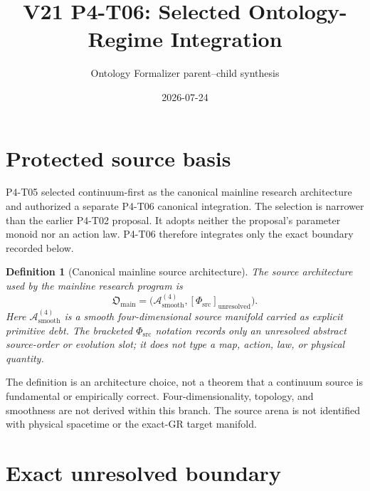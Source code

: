 \documentclass[11pt]{article}
\title{V21 P4-T06: Selected Ontology-Regime Integration}
\author{Ontology Formalizer parent--child synthesis}
\date{2026-07-24}
\newcommand{\A}{\mathcal A}
\newcommand{\PhiSrc}{\Phi_{\mathrm{src}}}
\newtheorem{definition}{Definition}
\begin{document}
\maketitle

\begin{center}
\end{center}

\section{Protected source basis}

P4-T05 selected continuum-first as the canonical mainline research
architecture and authorized a separate P4-T06 canonical integration. The
selection is narrower than the earlier P4-T02 proposal. It adopts neither the
proposal's parameter monoid nor an action law. P4-T06 therefore integrates
only the exact boundary recorded below.

\begin{definition}[Canonical mainline source architecture]
The source architecture used by the mainline research program is
\[
  \mathfrak O_{\mathrm{main}}
  =
  \bigl(\A^{(4)}_{\mathrm{smooth}},
        [\PhiSrc]_{\mathrm{unresolved}}\bigr).
\]
Here \(\A^{(4)}_{\mathrm{smooth}}\) is a smooth four-dimensional source
manifold carried as explicit primitive debt. The bracketed
\(\PhiSrc\) notation records only an unresolved abstract source-order or
evolution slot; it does not type a map, action, law, or physical quantity.
\end{definition}

The definition is an architecture choice, not a theorem that a continuum
source is fundamental or empirically correct. Four-dimensionality, topology,
and smoothness are not derived within this branch. The source arena is not
identified with physical spacetime or the exact-GR target manifold.

\section{Exact unresolved boundary}
\end{document}
